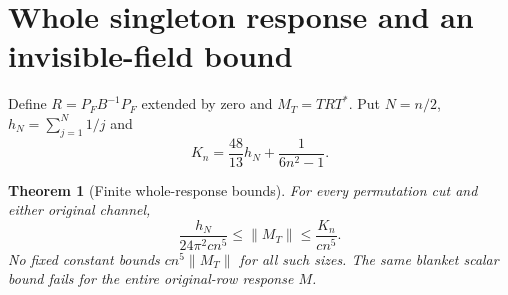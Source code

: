 \documentclass[11pt]{article}
\newcommand{\norm}[1]{\lVert#1\rVert}
\newtheorem{theorem}{Theorem}[section]
\theoremstyle{definition}
\theoremstyle{remark}
\begin{document}
\section{Whole singleton response and an invisible-field bound}\label{sec:whole}
Define $R=P_FB^{-1}P_F$ extended by zero and $M_T=TRT^*$. Put
$N=n/2$, $h_N=\sum_{j=1}^N1/j$ and
\begin{equation}\label{eq:Kn}
                   K_n=\frac{48}{13}h_N+\frac1{6n^2-1}.
\end{equation}

\begin{theorem}[Finite whole-response bounds]\label{thm:whole}
For every permutation cut and either original channel,
\begin{equation}\label{eq:whole}
 \frac{h_N}{24\pi^2cn^5}\le\norm{M_T}\le\frac{K_n}{cn^5}.
\end{equation}
No fixed constant bounds $cn^5\norm{M_T}$ for all such sizes. The same
blanket scalar bound fails for the entire original-row response $M$.
\end{theorem}
\end{document}
